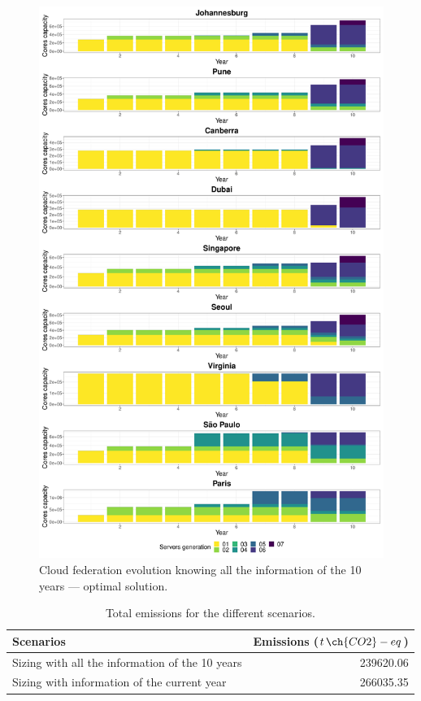 \begin{figure}
\centering
  \includegraphics[width=\linewidth]{images/dc_evolution_optimal.pdf}
  \caption{Cloud federation evolution knowing all the information of the 10 years --- optimal solution.}
  \label{fig:dc_evolution_optimal}
\end{figure}

\begin{table}[!ht]
  
\caption{Total emissions for the different scenarios.}\label{tab:emissions_sizing} \centering

\begin{tabular}{|l|r|}
  \hline
  \textbf{Scenarios} & \textbf{Emissions ($t\,\ch{CO2}-eq$)}   \\
  \hline  
   Sizing with all the information of the 10 years  & 239620.06     \\  
  \hline
  Sizing with information of the current year       & 266035.35     \\
  \hline

\end{tabular}
\end{table}

